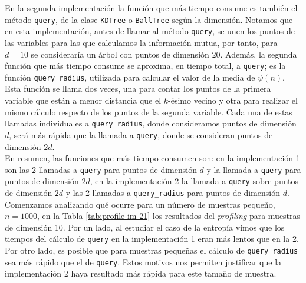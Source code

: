 \documentclass[12pt,a4paper]{report} %
\theoremstyle{definition}
\begin{document}
En la segunda implementación la función que más tiempo consume es también el método \texttt{query}, de la clase \texttt{KDTree} o \texttt{BallTree} según la dimensión. Notamos que en esta implementación, antes de llamar al método \texttt{query}, se unen los puntos de las variables para las que calculamos la información mutua, por tanto, para $d=10$ se consideraría un árbol con puntos de dimensión $20$. Además, la segunda función que más tiempo consume se aproxima, en tiempo total, a \texttt{query}; es la función  \texttt{query\_radius}, utilizada para calcular el valor de la media de $\psi(n)$. Esta función se llama dos veces, una para contar los puntos de la primera variable que están a menor distancia que el $k$-ésimo vecino y otra para realizar el mismo cálculo respecto de los puntos de la segunda variable. Cada una de estas llamadas individuales a \texttt{query\_radius}, donde consideramos puntos de dimensión $d$, será más rápida que la llamada a \texttt{query}, donde se consideran puntos de dimensión $2d$.\\

En resumen, las funciones que más tiempo consumen son: en la implementación 1 son las 2 llamadas a \texttt{query} para puntos de dimensión $d$ y la llamada a \texttt{query} para puntos de dimensión $2d$, en la implementación 2 la llamada a \texttt{query} sobre puntos de dimensión $2d$ y las 2 llamadas a \texttt{query\_radius} para puntos de dimensión $d$.\\

Comenzamos analizando qué ocurre para un número de muestras pequeño, $n=1000$, en la Tabla \ref{tab:profile-im-21} los resultados del \textit{profiling} para muestras de dimensión 10. Por un lado, al estudiar el caso de la entropía vimos que los tiempos del cálculo de \texttt{query} en la implementación 1 eran más lentos que en la 2. Por otro lado, es posible que para muestras pequeñas el cálculo de \texttt{query\_radius} sea más rápido que el de \texttt{query}. Estos motivos nos permiten justificar que la implementación 2 haya resultado más rápida para este tamaño de muestra.\\
\end{document}
